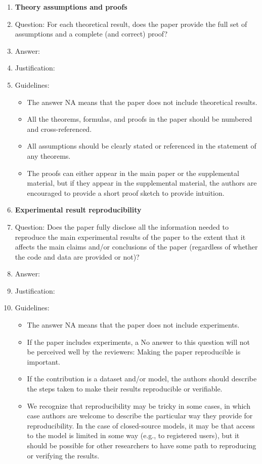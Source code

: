 \documentclass{article}
\begin{document}
\begin{enumerate}
\item {\bf Theory assumptions and proofs}
    \item[] Question: For each theoretical result, does the paper provide the full set of assumptions and a complete (and correct) proof?
    \item[] Answer: \answerTODO{} %
    \item[] Justification: \justificationTODO{}
    \item[] Guidelines:
    \begin{itemize}
        \item The answer NA means that the paper does not include theoretical results. 
        \item All the theorems, formulas, and proofs in the paper should be numbered and cross-referenced.
        \item All assumptions should be clearly stated or referenced in the statement of any theorems.
        \item The proofs can either appear in the main paper or the supplemental material, but if they appear in the supplemental material, the authors are encouraged to provide a short proof sketch to provide intuition. 
    \end{itemize}

    \item {\bf Experimental result reproducibility}
    \item[] Question: Does the paper fully disclose all the information needed to reproduce the main experimental results of the paper to the extent that it affects the main claims and/or conclusions of the paper (regardless of whether the code and data are provided or not)?
    \item[] Answer: \answerTODO{} %
    \item[] Justification: \justificationTODO{}
    \item[] Guidelines:
    \begin{itemize}
        \item The answer NA means that the paper does not include experiments.
        \item If the paper includes experiments, a No answer to this question will not be perceived well by the reviewers: Making the paper reproducible is important.
        \item If the contribution is a dataset and/or model, the authors should describe the steps taken to make their results reproducible or verifiable. 
        \item We recognize that reproducibility may be tricky in some cases, in which case authors are welcome to describe the particular way they provide for reproducibility. In the case of closed-source models, it may be that access to the model is limited in some way (e.g., to registered users), but it should be possible for other researchers to have some path to reproducing or verifying the results.
    \end{itemize}


\end{enumerate}
\end{document}
